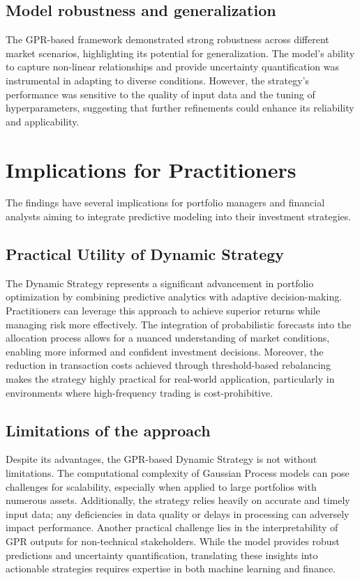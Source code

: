 \subsection{Model robustness and generalization}
The \ac{GPR}-based framework demonstrated strong robustness across different market scenarios, highlighting its potential for generalization. The model’s ability to capture non-linear relationships and provide uncertainty quantification was instrumental in adapting to diverse conditions. However, the strategy’s performance was sensitive to the quality of input data and the tuning of hyperparameters, suggesting that further refinements could enhance its reliability and applicability.
\section{Implications for Practitioners}
The findings have several implications for portfolio managers and financial analysts aiming to integrate predictive modeling into their investment strategies.
\subsection{Practical Utility of Dynamic Strategy}
The Dynamic Strategy represents a significant advancement in portfolio optimization by combining predictive analytics with adaptive decision-making. Practitioners can leverage this approach to achieve superior returns while managing risk more effectively. The integration of probabilistic forecasts into the allocation process allows for a nuanced understanding of market conditions, enabling more informed and confident investment decisions.
Moreover, the reduction in transaction costs achieved through threshold-based rebalancing makes the strategy highly practical for real-world application, particularly in environments where high-frequency trading is cost-prohibitive.
\subsection{Limitations of the approach}
Despite its advantages, the GPR-based Dynamic Strategy is not without limitations. The computational complexity of Gaussian Process models can pose challenges for scalability, especially when applied to large portfolios with numerous assets. Additionally, the strategy relies heavily on accurate and timely input data; any deficiencies in data quality or delays in processing can adversely impact performance.
Another practical challenge lies in the interpretability of GPR outputs for non-technical stakeholders. While the model provides robust predictions and uncertainty quantification, translating these insights into actionable strategies requires expertise in both machine learning and finance.


